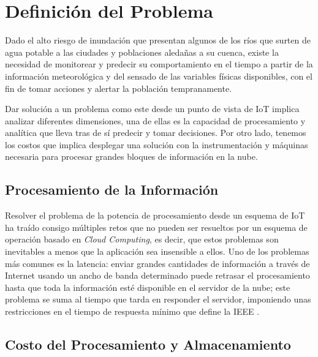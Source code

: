 
\chapter{Definición del Problema} %
\label{Chapter2}


Dado el alto riesgo de inundación que presentan algunos de los ríos que surten de agua potable a las ciudades y poblaciones aledañas a su cuenca, existe la necesidad de monitorear y predecir su comportamiento en el tiempo a partir de la información meteorológica y del sensado de las variables físicas disponibles, con el fin de tomar acciones y alertar la población tempranamente.

Dar solución a un problema como este desde un punto de vista de IoT implica analizar diferentes dimensiones, una de ellas es la capacidad de procesamiento y analítica que lleva tras de sí predecir y tomar decisiones. Por otro lado, tenemos los costos que implica desplegar una solución con la instrumentación y máquinas necesaria para procesar grandes bloques de información en la nube.

\section{Procesamiento de la Información}

Resolver el problema de la potencia de procesamiento desde un esquema de IoT ha traído consigo múltiples retos que no pueden ser resueltos por un esquema de operación basado en \textit{Cloud Computing}, es decir, que estos problemas son inevitables a menos que la aplicación sea insensible a ellos. Uno de los problemas más comunes es la latencia: enviar grandes cantidades de información a través de Internet usando un ancho de banda determinado puede retrasar el procesamiento hasta que toda la información esté disponible en el servidor de la nube; este problema se suma al tiempo que tarda en responder el servidor, imponiendo unas restricciones en el tiempo de respuesta mínimo que define la IEEE \citep{RTSSystems,FogBonomi}.


\section{Costo del Procesamiento y Almacenamiento}

